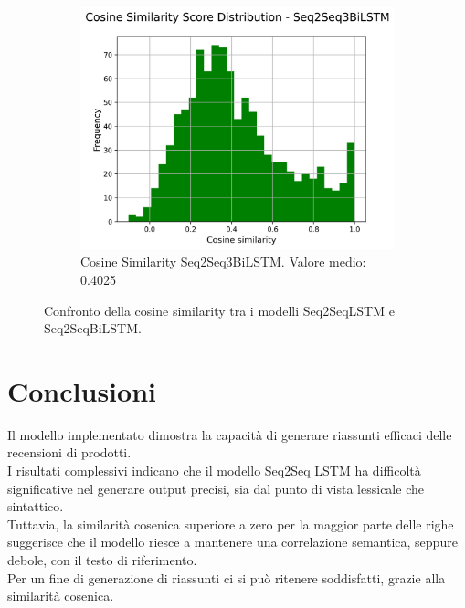\documentclass[a4paper, 12pt]{article}
\begin{document}
\begin{figure}[H]
\begin{subfigure}{0.45\textwidth}
    \end{subfigure}
    \begin{subfigure}{0.45\textwidth}
        \centering
        \includegraphics[width=\textwidth]{media/Seq2Seq3BiLSTM_cosine_similarity_scores.png}
        \caption{Cosine Similarity Seq2Seq3BiLSTM. Valore medio: 0.4025}
    \end{subfigure}
    \caption{Confronto della cosine similarity tra i modelli Seq2SeqLSTM e Seq2SeqBiLSTM.}
    \label{fig:cosine_similarity_comparison}
\end{figure}


\section{Conclusioni}
Il modello implementato dimostra la capacità di generare riassunti efficaci delle recensioni di prodotti.\\
I risultati complessivi indicano che il modello Seq2Seq LSTM ha difficoltà significative nel generare output precisi, sia dal punto di vista lessicale che sintattico. \\
Tuttavia, la similarità cosenica superiore a zero per la maggior parte delle righe suggerisce che il modello riesce a mantenere una correlazione semantica, seppure debole, con il testo di riferimento.\\
Per un fine di generazione di riassunti ci si può ritenere soddisfatti, grazie alla similarità cosenica.
\end{document}
